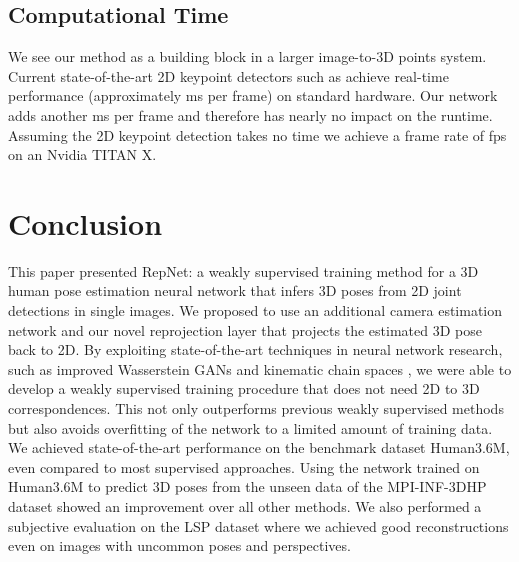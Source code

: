 \documentclass[10pt,twocolumn,letterpaper]{article}
\begin{document}
\subsection{Computational Time}
We see our method as a building block in a larger image-to-3D points system.
Current state-of-the-art 2D keypoint detectors such as \cite{cao2017realtime} achieve real-time performance (approximately ms per frame) on standard hardware.
Our network adds another ms per frame and therefore has nearly no impact on the runtime.
Assuming the 2D keypoint detection takes no time we achieve a frame rate of fps on an Nvidia TITAN X.

\section{Conclusion}
This paper presented RepNet: a weakly supervised training method for a 3D human pose estimation neural network that infers 3D poses from 2D joint detections in single images.
We proposed to use an additional camera estimation network and our novel reprojection layer that projects the estimated 3D pose back to 2D.
By exploiting state-of-the-art techniques in neural network research, such as improved Wasserstein GANs \cite{iwgan2017} and kinematic chain spaces \cite{WanAck2018a}, we were able to develop a weakly supervised training procedure that does not need 2D to 3D correspondences.
This not only outperforms previous weakly supervised methods but also avoids overfitting of the network to a limited amount of training data.
We achieved state-of-the-art performance on the benchmark dataset Human3.6M, even compared to most supervised approaches.
Using the network trained on Human3.6M to predict 3D poses from the unseen data of the MPI-INF-3DHP dataset showed an improvement over all other methods.
We also performed a subjective evaluation on the LSP dataset where we achieved good reconstructions even on images with uncommon poses and perspectives.

{\small


}
\end{document}
